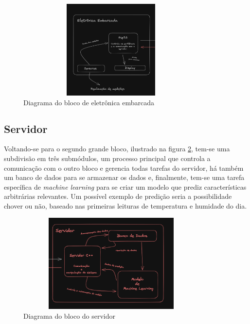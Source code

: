 \documentclass{article}
\begin{document}
\begin{figure}[ht]
	\centering
	\includegraphics[width=0.85\textwidth,height=5cm,keepaspectratio]{ee.png}
	\caption{Diagrama do bloco de eletrônica embarcada}
	\label{fig:embedded}
\end{figure}

\subsection*{Servidor}

Voltando-se para o segundo grande bloco, ilustrado na figura \ref{fig:server},
tem-se uma subdivisão em três submódulos, um processo principal que controla a comunicação
com o outro bloco e gerencia todas tarefas do servidor, há também um banco de dados para se
armazenar os dados e, finalmente, tem-se uma tarefa específica de
\textit{machine learning} para se criar um modelo que prediz características arbitrárias relevantes.
Um possível exemplo de predição seria a possibilidade chover ou não, baseado nas primeiras leituras de temperatura e
humidade do dia.

\begin{figure}[ht]
	\centering
	\includegraphics[width=0.85\textwidth,height=5cm,keepaspectratio]{sv.png}
	\caption{Diagrama do bloco do servidor}
	\label{fig:server}
\end{figure}
\end{document}
